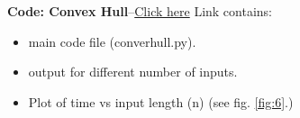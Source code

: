 \documentclass[a4paper,12pt]{article}
\begin{document}
\begin{center}
    \textbf{Code: Convex Hull}--\href{https://github.com/anshumitts/CSN212/tree/master/Ass4}{Click here}\newline
    Link contains: 
    \begin{itemize}
    	\item main code file (converhull.py).
    	\item output for different number of inputs.
        \item Plot of time vs input length (n) (see fig. \ref{fig:6}.)
    \end{itemize}
    \begin{figure}[ht!]
    \centering

\end{figure}
\end{center}
\end{document}

